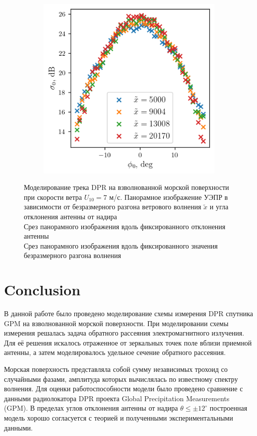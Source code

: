 \documentclass{article}
\begin{document}
\begin{figure}[t]
    \begin{subfigure}{\linewidth}
        \centering
        \includegraphics[width=0.6\linewidth]{figs/fetch_slices1.png}
        \caption{}
        \label{scap:crosssec_slices:3}
    \end{subfigure}
    \caption{
    Моделирование трека DPR на взволнованной морской поверхности при
        скорости ветра $U_{10}=7$ м/с.
         Панорамное изображение УЭПР в
        зависимости от безразмерного разгона ветрового волнения $\tilde x$ и
        угла отклонения антенны от надира
        \\
         Срез панорамного изображения
        вдоль фиксированного отклонения антенны
        \\
         Срез панорамного изображения
        вдоль фиксированного значения безразмерного разгона волнения
    }


    \label{fig:crosssec_clices}
\end{figure}



\section{Conclusion}

В данной работе было проведено моделирование схемы измерения DPR спутника GPM
на взволнованной морской поверхности. При моделировании схемы измерения 
решалась задача обратного рассеяния электромагнитного излучения. Для её решения искалось отраженное от зеркальных точек поле вблизи приемной антенны, а затем
моделировалось удельное сечение обратного рассеяния.

Морская поверхность представляла собой
сумму независимых трохоид со случайными фазами, амплитуда которых вычислялась
по известному спектру волнения. Для оценки работоспособности модели было
проведено сравнение с данными радиолокатора DPR проекта Global Precipitation
Measurements (GPM). В пределах углов отклонения антенны от надира $\theta \leq
\pm 12^{\circ}$ построенная модель хорошо согласуется с теорией и полученными
экспериментальными данными.
\end{document}
